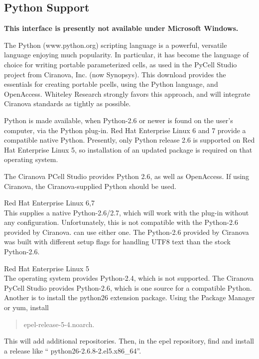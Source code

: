 \begin{itemize}
\section{Python Support}
\label{pyplugin}

{\bf This interface is presently not available under Microsoft Windows.}

The Python ({\vt www.python.org}) scripting language is a powerful,
versatile language enjoying much popularity.  In particular, it has
become the language of choice for writing portable parameterized
cells, as used in the PyCell Studio project from Ciranova, Inc.  (now
Synopsys).
This download provides the essentials for creating portable pcells,
using the Python language, and OpenAccess.  Whiteley Research strongly
favors this approach, and will integrate Ciranova standards as tightly
as possible.

Python is made available, when Python-2.6 or newer is found on the
user's computer, via the Python plug-in.  Red Hat Enterprise Linux 6
and 7 provide a compatible native Python.  Presently, only Python
release 2.6 is supported on Red Hat Enterprise Linux 5, so
installation of an updated package is required on that operating
system.

The Ciranova PCell Studio provides Python 2.6, as well as OpenAccess. 
If using Ciranova, the Ciranova-supplied Python should be used.

\begin{description}
\item{Red Hat Enterprise Linux 6,7}\\
This supplies a native Python-2.6/2.7, which will work with the
plug-in without any configuration.
Unfortunately, this is not compatible with the Python-2.6 provided by
Ciranova.  {\Xic} can use either one.  The Python-2.6 provided by
Ciranova was built with different setup flags for handling UTF8 text
than the stock Python-2.6.

\item{Red Hat Enterprise Linux 5}\\
The operating system provides Python-2.4, which is not supported.  The
Ciranova PyCell Studio provides Python-2.6, which is one source for a
compatible Python.  Another is to install the {\vt python26} extension
package.  Using the {\cb Package Manager} or {\vt yum}, install
\begin{quote}
{\vt epel-release-5-4.noarch}.
\end{quote}
This will add additional repositories.  Then, in the {\vt epel}
repository, find and install a release like ``{\vt
python26-2.6.8-2.el5.x86\_64}''.
\end{description}


\end{itemize}
